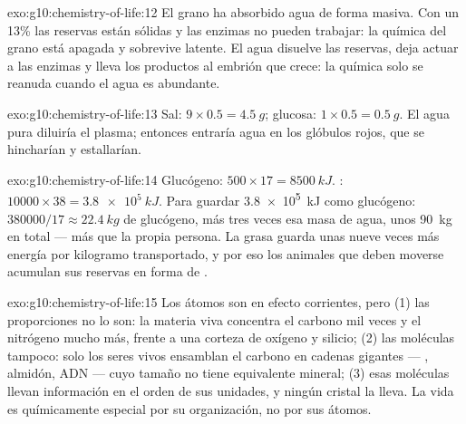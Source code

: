 \begin{solution}{exo:g10:chemistry-of-life:12}
El grano ha absorbido agua de forma masiva. Con un 13\% las reservas
están sólidas y las enzimas no pueden trabajar: la química del grano
está apagada y sobrevive latente. El agua disuelve las reservas, deja
actuar a las enzimas y lleva los productos al embrión que crece: la
química solo se reanuda cuando el agua es abundante.
\end{solution}

\begin{solution}{exo:g10:chemistry-of-life:13}
Sal: $9 \times 0.5 = \qty{4.5}{g}$; glucosa: $1 \times 0.5 =
\qty{0.5}{g}$. El agua pura diluiría el plasma; entonces entraría agua
en los glóbulos rojos, que se hincharían y estallarían.
\end{solution}

\begin{solution}{exo:g10:chemistry-of-life:14}
Glucógeno: $500 \times 17 = \qty{8500}{kJ}$. : $10000 \times 38 =
\qty{3.8e5}{kJ}$. Para guardar \qty{3.8e5}{kJ} como glucógeno:
$380000/17
\approx \qty{22.4}{kg}$ de glucógeno, más tres veces esa
masa de agua, unos \qty{90}{kg} en total --- más que la propia persona.
La grasa guarda unas nueve veces más energía por kilogramo
transportado, y por eso los animales que deben moverse acumulan sus
reservas en forma de .
\end{solution}

\begin{solution}{exo:g10:chemistry-of-life:15}
Los átomos son en efecto corrientes, pero (1) las proporciones no lo
son: la materia viva concentra el carbono mil veces y el nitrógeno
mucho más, frente a una corteza de oxígeno y silicio; (2) las moléculas
tampoco: solo los seres vivos ensamblan el carbono en cadenas gigantes
--- , almidón, ADN --- cuyo tamaño no tiene equivalente
mineral; (3) esas moléculas llevan información en el orden de sus
unidades, y ningún cristal la lleva. La vida es químicamente especial
por su organización, no por sus átomos.
\end{solution}

